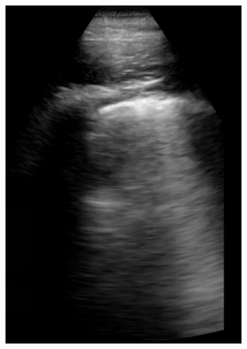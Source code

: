 \documentclass[11pt]{article} %
\begin{document}
		
	\begin{figure}
	\centering
		\begin{subfigure}{0.25\textwidth}
		\includegraphics[width=\textwidth]{figuras/frame1.png}
		\end{subfigure}
		\begin{subfigure}{0.25\textwidth}

\end{subfigure}
\end{figure}
\end{document}
